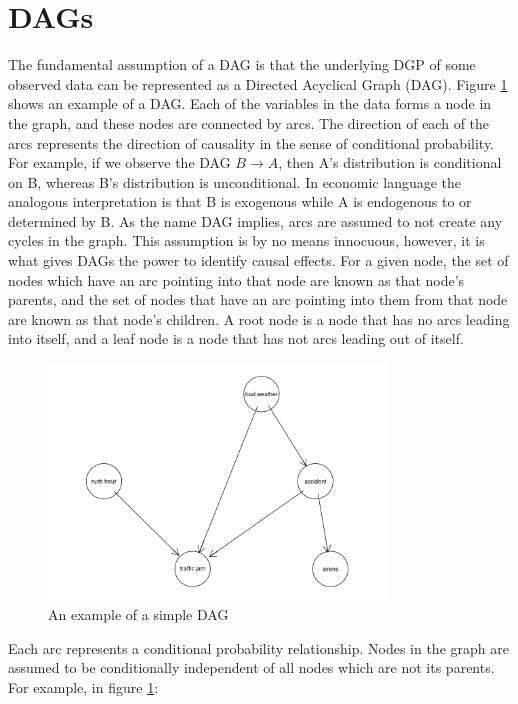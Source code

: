\documentclass{article}
\begin{document}
\section{DAGs}

The fundamental assumption of a DAG is that the underlying DGP of some observed data can be represented as a Directed Acyclical Graph (DAG). Figure \ref{dag1} shows an example of a DAG. Each of the variables in the data forms a node in the graph, and these nodes are connected by arcs. The direction of each of the arcs represents the direction of causality in the sense of conditional probability. For example, if we observe the DAG $B \rightarrow A$, then A's distribution is conditional on B, whereas B's distribution is unconditional. In economic language the analogous interpretation is that B is exogenous while A is endogenous to or determined by B. As the name DAG implies, arcs are assumed to not create any cycles in the graph. This assumption is by no means innocuous, however, it is what gives DAGs the power to identify causal effects. For a given node, the set of nodes which have an arc pointing into that node are known as that node's parents, and the set of nodes that have an arc pointing into them from that node are known as that node's children. A root node is a node that has no arcs leading into itself, and a leaf node is a node that has not arcs leading out of itself.

\begin{figure}
  \centering
  \includegraphics[width=0.8\textwidth]{images/trafficjam.png}
  \caption{An example of a simple DAG \parencite{traffic_jam}}
  \label{dag1}
\end{figure}

Each arc represents a conditional probability relationship. Nodes in the graph are assumed to be conditionally independent of all nodes which are not its parents. For example, in figure \ref{dag1}: 
\end{document}

